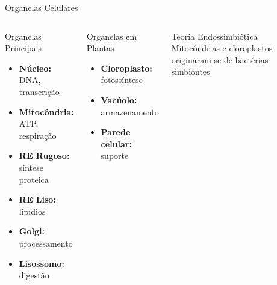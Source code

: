 \begin{frame}[allowframebreaks]{Organelas Celulares}
\begin{columns}
\begin{block}{Organelas Principais}
\begin{itemize}
    \item \textbf{Núcleo:} DNA, transcrição
    \item \textbf{Mitocôndria:} ATP, respiração
    \item \textbf{RE Rugoso:} síntese proteica
    \item \textbf{RE Liso:} lipídios
    \item \textbf{Golgi:} processamento
    \item \textbf{Lisossomo:} digestão
\end{itemize}
\end{block}

\begin{block}{Organelas em Plantas}
\begin{itemize}
    \item \textbf{Cloroplasto:} fotossíntese
    \item \textbf{Vacúolo:} armazenamento
    \item \textbf{Parede celular:} suporte
\end{itemize}
\end{block}

\begin{exampleblock}{Teoria Endossimbiótica}
Mitocôndrias e cloroplastos originaram-se de bactérias simbiontes
\end{exampleblock}
\end{columns}
\end{frame}

